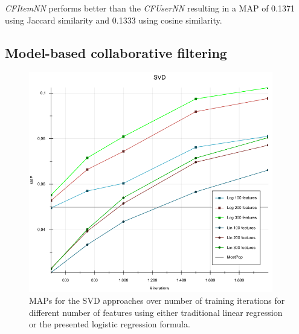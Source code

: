 \documentclass[10pt]{reportMaster}
\begin{document}
\textit{CFItemNN} performs better than the \textit{CFUserNN} resulting in a MAP of 0.1371 using Jaccard similarity and 0.1333 using cosine similarity.

\FloatBarrier

\subsection*{Model-based collaborative filtering}

\begin{figure}[h!]
	\centering
	\includegraphics[width=0.95\textwidth]{figures/experiments/SVDIterations}
	\caption[MAPs for SVD approaches over different number of iterations]{MAPs for the SVD approaches over number of training iterations for different number of features using either traditional linear regression or the presented logistic regression formula.}
	\label{fig:SVDIterations}
\end{figure}
\end{document}
